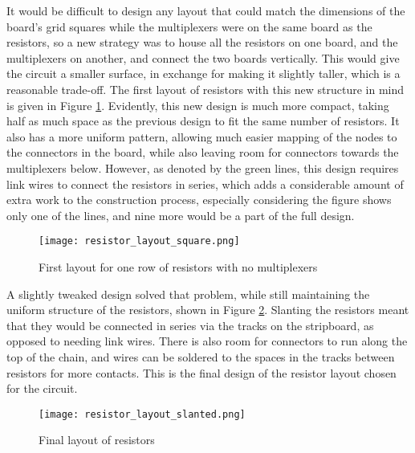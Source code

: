 It would be difficult to design any layout that could match the dimensions of the board's grid squares while the multiplexers were on the same board as the resistors, so a new strategy was to house all the resistors on one board, and the multiplexers on another, and connect the two boards vertically. This would give the circuit a smaller surface, in exchange for making it slightly taller, which is a reasonable trade-off. The first layout of resistors with this new structure in mind is given in Figure \ref{fig:resistor_layout_square}. Evidently, this new design is much more compact, taking half as much space as the previous design to fit the same number of resistors. It also has a more uniform pattern, allowing much easier mapping of the nodes to the connectors in the board, while also leaving room for connectors towards the multiplexers below. However, as denoted by the green lines, this design requires link wires to connect the resistors in series, which adds a considerable amount of extra work to the construction process, especially considering the figure shows only one of the lines, and nine more would be a part of the full design. \\

\begin{figure}[H]
	\begin{center}
	\texttt{[image: resistor\_layout\_square.png]}\\ 
  	\caption{First layout for one row of resistors with no multiplexers}
    \label{fig:resistor_layout_square}
    \end{center}
\end{figure}


A slightly tweaked design solved that problem, while still maintaining the uniform structure of the resistors, shown in Figure \ref{fig:resistor_layout_slanted}. Slanting the resistors meant that they would be connected in series via the tracks on the stripboard, as opposed to needing link wires. There is also room for connectors to run along the top of the chain, and wires can be soldered to the spaces in the tracks between resistors for more contacts. This is the final design of the resistor layout chosen for the circuit.

\begin{figure}[H]
	\begin{center}
	\texttt{[image: resistor\_layout\_slanted.png]}\\ 
  	\caption{Final layout of resistors}
    \label{fig:resistor_layout_slanted}
    \end{center}
\end{figure}



